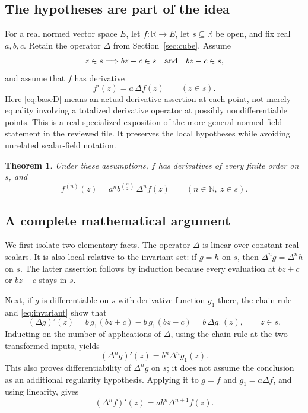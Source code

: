 \documentclass[11pt,a4paper]{article}
\newcommand{\R}{\mathbb R}
\newcommand{\N}{\mathbb N}
\newtheorem{theorem}{Theorem}[section]
\theoremstyle{remark}
\begin{document}
\subsection{The hypotheses are part of the idea}

For a real normed vector space \(E\), let \(f:\R\to E\), let \(s\subseteq\R\) be open, and fix real \(a,b,c\). Retain the operator \(\Delta\) from Section~\ref{sec:cube}. Assume
\begin{equation}\label{eq:invariant}
 z\in s\Longrightarrow bz+c\in s\quad\hbox{and}\quad bz-c\in s,
\end{equation}
and assume that \(f\) has derivative
\begin{equation}\label{eq:baseD}
 f'(z)=a\,\Delta f(z)\qquad(z\in s).
\end{equation}
Here \eqref{eq:baseD} means an actual derivative assertion at each point, not merely equality involving a totalized derivative operator at possibly nondifferentiable points. This is a real-specialized exposition of the more general normed-field statement in the reviewed file. It preserves the local hypotheses while avoiding unrelated scalar-field notation.

\begin{theorem}\label{thm:derivative}
Under these assumptions, \(f\) has derivatives of every finite order on \(s\), and
\begin{equation}\label{eq:derivative}
 f^{(n)}(z)=a^n b^{\binom n2}\,\Delta^n f(z)
 \qquad(n\in\N,\ z\in s).
\end{equation}
\end{theorem}

\subsection{A complete mathematical argument}

We first isolate two elementary facts. The operator \(\Delta\) is linear over constant real scalars. It is also local relative to the invariant set: if \(g=h\) on \(s\), then \(\Delta^n g=\Delta^n h\) on \(s\). The latter assertion follows by induction because every evaluation at \(bz+c\) or \(bz-c\) stays in \(s\).

Next, if \(g\) is differentiable on \(s\) with derivative function \(g_1\) there, the chain rule and \eqref{eq:invariant} show that
\[
 (\Delta g)'(z)=b\,g_1(bz+c)-b\,g_1(bz-c)
              =b\,\Delta g_1(z),\qquad z\in s.
\]
Inducting on the number of applications of \(\Delta\), using the chain rule at the two transformed inputs, yields
\begin{equation}\label{eq:commute}
 (\Delta^n g)'(z)=b^n\Delta^n g_1(z).
\end{equation}
This also proves differentiability of \(\Delta^n g\) on \(s\); it does not assume the conclusion as an additional regularity hypothesis. Applying it to \(g=f\) and \(g_1=a\Delta f\), and using linearity, gives
\begin{equation}\label{eq:orbitD}
 (\Delta^n f)'(z)=a b^n\Delta^{n+1}f(z).
\end{equation}
\end{document}
